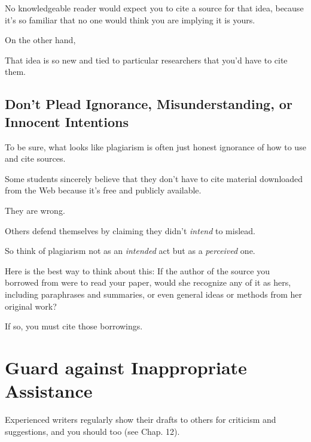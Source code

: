 \documentclass[oneside]{book}
\numberwithin{equation}{section}
\begin{document}
No knowledgeable reader would expect you to cite a source for that idea, because it's so familiar that no one would think you are implying it is yours.

On the other hand, 

That idea is so new and tied to particular researchers that you'd have to cite them.

\subsection{Don't Plead Ignorance, Misunderstanding, or Innocent Intentions}
To be sure, what looks like plagiarism is often just honest ignorance of how to use and cite sources.

Some students sincerely believe that they don't have to cite material downloaded from the Web because it's free and publicly available.

They are wrong.

Others defend themselves by claiming they didn't \textit{intend} to mislead.


So think of plagiarism not as an \textit{intended} act but as a \textit{perceived} one.

Here is the best way to think about this: If the author of the source you borrowed from were to read your paper, would she recognize any of it as hers, including paraphrases and summaries, or even general ideas or methods from her original work?

If so, you must cite those borrowings.

\section{Guard against Inappropriate Assistance}
Experienced writers regularly show their drafts to others for criticism and suggestions, and you should too (see Chap. 12).
\end{document}
